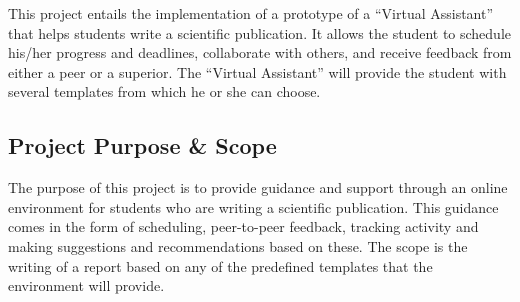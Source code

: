 This project entails the implementation of a prototype of a ``Virtual Assistant'' that helps students write a scientific publication.
It allows the student to schedule his/her progress and deadlines, collaborate with others, and receive feedback from either
a peer or a superior. The ``Virtual Assistant'' will provide the student with several templates from which he or she can choose.

\subsection{Project Purpose \& Scope} %
\label{sub:project_purpose_&_scope}
The purpose of this project is to provide guidance and support through an online environment for students who are
writing a scientific publication. This guidance comes in the form of scheduling, peer-to-peer feedback, tracking activity and 
making suggestions and recommendations based on these. The scope is the writing of a report based on any of the predefined templates that 
the environment will provide.
